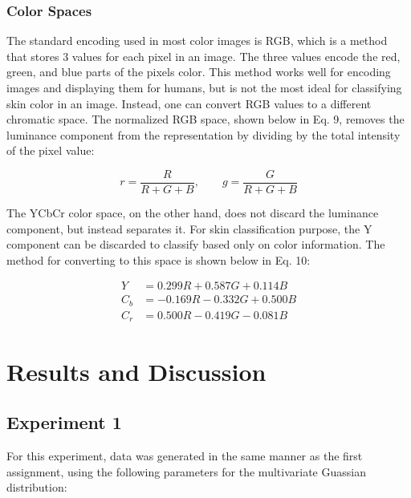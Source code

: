 \documentclass{article}
\begin{document}
\subsubsection{Color Spaces}\label{Color Spaces}
The standard encoding used in most color images is RGB, which is a method that stores 3 values for each pixel in an image. 
The three values encode the red, green, and blue parts of the pixels color. This method works well for encoding images
and displaying them for humans, but is not the most ideal for classifying skin color in an image. Instead, one can convert
RGB values to a different chromatic space. The normalized RGB space, shown below in Eq. 9, removes the luminance component 
from the representation by dividing by the total intensity of the pixel value:

\begin{equation}
r = \frac{R}{R + G + B}, \qquad g = \frac{G}{R + G + B}
\label{eq:chromatic1}
\end{equation}

The YCbCr color space, on the other hand, does not discard the luminance component, but instead separates it. For skin classification
purpose, the Y component can be discarded to classify based only on color information. The method for converting to this space 
is shown below in Eq. 10:

\begin{equation}
\begin{aligned}
Y  &= 0.299R + 0.587G + 0.114B \\
C_b &= -0.169R - 0.332G + 0.500B \\
C_r &= 0.500R - 0.419G - 0.081B
\end{aligned}
\label{eq:chromatic2}
\end{equation}

\section{Results and Discussion}\label{results-and-discussion}

\subsection{Experiment 1}\label{experiment-1-1}
\noindent For this experiment, data was generated in the same manner as the first assignment, using the following parameters for the multivariate 
Guassian distribution: 
\end{document}
